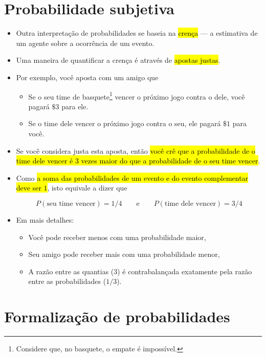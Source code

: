 \documentclass[
  11pt]{report}
\begin{document}
\hypertarget{probabilidade-subjetiva}{%
\section{Probabilidade subjetiva}\label{probabilidade-subjetiva}}

\begin{itemize}
\item
  Outra interpretação de probabilidades se baseia na {\hl{crença}} --- a estimativa de um agente sobre a ocorrência de um evento.
\item
  Uma maneira de quantificar a crença é através de {\hl{apostas justas}}.
\item
  Por exemplo, você aposta com um amigo que

  \begin{itemize}
  \item
    Se o seu time de basquete\footnote{Considere que, no basquete, o empate é impossível.} vencer o próximo jogo contra o dele, você pagará $\$3$ para ele.
  \item
    Se o time dele vencer o próximo jogo contra o seu, ele pagará $\$1$ para você.
  \end{itemize}
\item
  Se você considera justa esta aposta, então {\hl{você crê que a probabilidade de o time dele vencer é $3$ vezes maior do que a probabilidade de o seu time vencer}}.
\item
  Como {\hl{a soma das probabilidades de um evento e do evento complementar deve ser $1$}}, isto equivale a dizer que

  \[
  P(\text{seu time vencer}) = 1/4 \qquad\text{e}\qquad  P(\text{time dele vencer}) = 3/4
  \]
\item
  Em mais detalhes:

  \begin{itemize}
  \item
    Você pode receber menos com uma probabilidade maior,
  \item
    Seu amigo pode receber mais com uma probabilidade menor,
  \item
    A razão entre as quantias ($3$) é contrabalançada exatamente pela razão entre as probabilidades ($1/3$).
  \end{itemize}
\end{itemize}

\hypertarget{axiomas}{%
\section{Formalização de probabilidades}\label{axiomas}}
\end{document}
